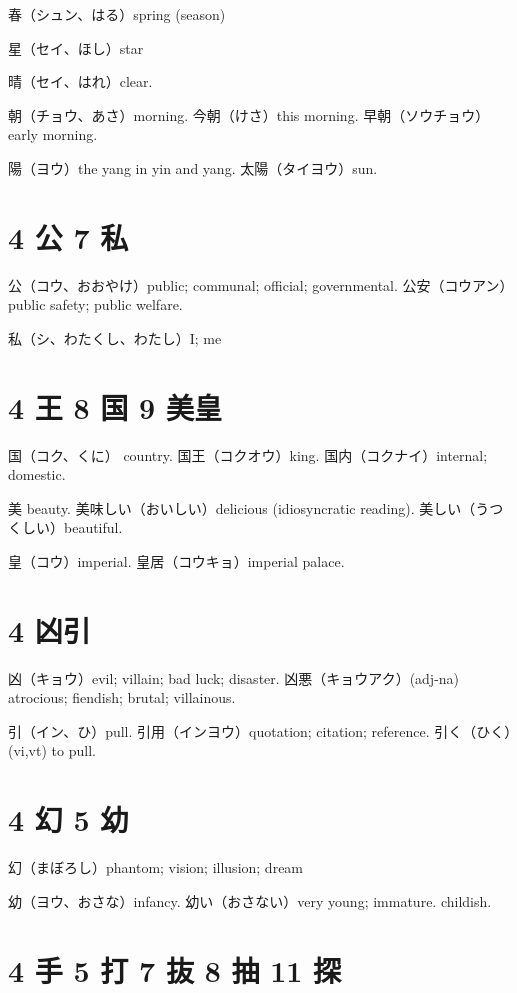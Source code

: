 春（シュン、はる）spring (season)

星（セイ、ほし）star

晴（セイ、はれ）clear.

朝（チョウ、あさ）morning.
今朝（けさ）this morning.
早朝（ソウチョウ）early morning.

陽（ヨウ）the yang in yin and yang.
太陽（タイヨウ）sun.

\section{4 公 7 私}

公（コウ、おおやけ）public; communal; official; governmental.
公安（コウアン）public safety; public welfare.

私（シ、わたくし、わたし）I; me

\section{4 王 8 国 9 美皇}

国（コク、くに） country.
国王（コクオウ）king.
国内（コクナイ）internal; domestic.

美 beauty.
美味しい（おいしい）delicious (idiosyncratic reading).
美しい（うつくしい）beautiful.

皇（コウ）imperial.
皇居（コウキョ）imperial palace.

\section{4 凶引}

凶（キョウ）evil; villain; bad luck; disaster.
凶悪（キョウアク）(adj-na) atrocious; fiendish; brutal; villainous.

引（イン、ひ）pull.
引用（インヨウ）quotation; citation; reference.
引く（ひく）(vi,vt) to pull.

\section{4 幻 5 幼}

幻（まぼろし）phantom; vision; illusion; dream

幼（ヨウ、おさな）infancy.
幼い（おさない）very young; immature. childish.

\section{4 手 5 打 7 抜 8 抽 11 探}

